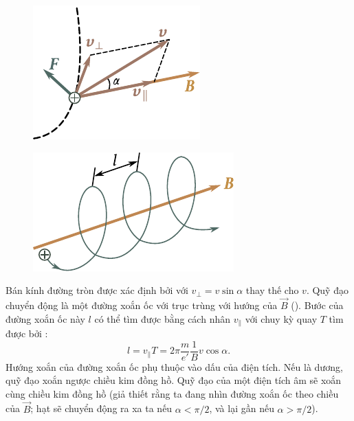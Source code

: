 \begin{figure}[t]
	\begin{minipage}[t]{0.48\linewidth}
		\begin{center}
			\includegraphics[scale=1]{figures/ch_10/fig_10_1.pdf}
			\caption[]{}
			\label{fig:10_1}
		\end{center}
	\end{minipage}
	\hfill{ }%
	\begin{minipage}[t]{0.48\linewidth}
		\begin{center}
			\includegraphics[scale=1]{figures/ch_10/fig_10_2.pdf}
			\caption[]{}
			\label{fig:10_2}
		\end{center}
	\end{minipage}
\vspace{-0.4cm}
\end{figure}

Bán kính đường tròn được xác định bởi  với $v_{\perp} = v\sin\alpha$ thay thế cho $v$.
Quỹ đạo chuyển động là một đường xoắn ốc với trục trùng với hướng của $\vec{B}$ ().
Bước của đường xoắn ốc này $l$ có thể tìm được bằng cách nhân $v_{\parallel}$ với chuy kỳ quay  $T$ tìm được bởi :
\begin{equation}\label{eq:10_4}
    l = v_{\parallel} T = 2\pi \frac{m}{e'} \frac{1}{B} v \cos\alpha.
\end{equation}
Hướng xoắn của đường xoắn ốc phụ thuộc vào dấu của điện tích.
Nếu là dương, quỹ đạo xoắn ngược chiều kim đồng hồ.
Quỹ đạo của một điện tích âm sẽ xoắn cùng chiều kim đồng hồ (giả thiết rằng ta đang nhìn đường xoắn ốc theo chiều của $\vec{B}$; hạt sẽ chuyển động ra xa ta nếu $\alpha<\pi/2$, và lại gần nếu $\alpha>\pi/2$).

